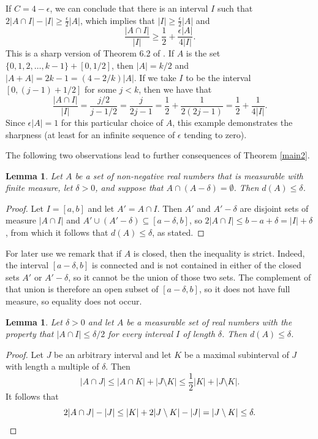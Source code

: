 \documentclass[11pt,reqno]{amsart}
\newtheorem{lemma}[theorem]{Lemma}
\theoremstyle{definition}
\def\e{\epsilon}
\def\d{\delta}
\def\subset{\subseteq}
\begin{document}
If $C=4-\e$, we can conclude that there is an interval $I$ such that $2|A\cap I|-|I|\geq\frac{\e}{2}|A|$, which implies that $|I|\geq\frac{\e}{2}|A|$ and \[\frac{|A\cap I|}{|I|}\geq\frac 12+\frac{\e|A|}{4|I|}.\]
This is a sharp version of Theorem 6.2 of \cite{EberhardGreenManners2014}. If $A$ is the set $\{0,1,2,\dots,k-1\}+[0,1/2]$, then $|A|=k/2$ and $|A+A|=2k-1=(4-2/k)|A|$. If we take $I$ to be the interval $[0,(j-1)+1/2]$ for some $j<k$, then we have that 
\[\frac{|A\cap I|}{|I|}=\frac{j/2}{j-1/2}=\frac j{2j-1}=\frac 12+\frac 1{2(2j-1)}=\frac 12+\frac 1{4|I|}.\]
Since $\e|A|=1$ for this particular choice of $A$, this example demonstrates the sharpness (at least for an infinite sequence of $\e$ tending to zero). 
\medskip


The following two observations lead to further consequences of Theorem \ref{main2}. 

\begin{lemma} \label{discrepancy observation}
Let $A$ be a set of non-negative real numbers that is measurable  with finite measure, let $\d>0$, and suppose that $A\cap(A-\d)=\emptyset$. Then $d(A)\leq\d$.
\end{lemma}

\begin{proof}
Let $I=[a,b]$ and let $A'=A\cap I$. Then $A'$ and $A'-\d$ are disjoint sets of measure $|A\cap I|$ and $A'\cup(A'-\d)\subset[a-\d,b]$, so $2|A\cap I|\leq b-a+\d=|I|+\d$, from which it follows that $d(A)\leq\d$, as stated. 
\end{proof}
\noindent For later use we remark that if $A$ is closed, then the inequality is strict. Indeed, the interval $[a-\d,b]$ is connected and is not contained in either of the closed sets $A'$ or $A'-\d$, so it cannot be the union of those two sets. The complement of that union is therefore an open subset of $[a-\d,b]$, so it does not have full measure, so equality does not occur.

\begin{lemma} \label{discrepancy observation2}
Let $\d>0$ and let $A$ be a measurable set of real numbers with the property that $|A\cap I|\leq\d/2$ for every interval $I$ of length $\d$. Then $d(A)\leq\d$.
\end{lemma}

\begin{proof}
    Let $J$ be an arbitrary interval and let $K$ be a maximal subinterval of $J$ with length a multiple of $\d$. Then 
    \[|A\cap J|\leq|A\cap K|+|J\setminus K|\leq\frac 12|K|+|J\setminus K|.\]
    It follows that
    \[2|A\cap J|-|J|\leq|K|+2|J\setminus K|-|J|=|J\setminus K|\leq \d.\qedhere\]
\end{proof}
\end{document}
